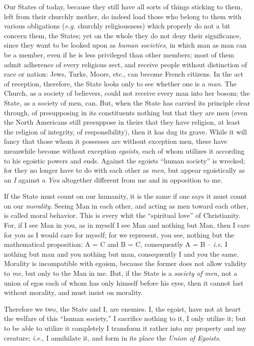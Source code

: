 \documentclass[12pt,a4paper]{book}
\begin{document}
Our States of today, because they still have all sorts of things sticking to 
them, left from their churchly mother, do indeed load those who belong to them 
with various obligations (\textit{e.g.} churchly religiousness) which 
properly do not a bit concern them, the States; yet on the whole they do not 
deny their significance, since they want to be looked upon as \textit{human 
societies}, in which man as man can be a member, even if he is less privileged 
than other members; most of them admit adherence of every religious sect, and 
receive people without distinction of race or nation: Jews, Turks, Moors, 
etc., can become French citizens. In the act of reception, therefore, the 
State looks only to see whether one is a \textit{man}. The Church, as a 
society of believers, could not receive every man into her bosom; the State, 
as a society of men, can. But, when the State has carried its principle clear 
through, of presupposing in its constituents nothing but that they are men 
(even the North Americans still presuppose in theirs that they have religion, 
at least the religion of integrity, of responsibility), then it has dug its 
grave. While it will fancy that those whom it possesses are without exception 
men, these have meanwhile become without exception \textit{egoists}, each of 
whom utilizes it according to his egoistic powers and ends. Against the 
egoists ``human society'' is wrecked; for they no longer have to do with 
each other as \textit{men}, but appear egoistically as an \textit{I} against a 
\textit{You} altogether different from me and in opposition to me.

If the State must count on our humanity, it is the same if one says it must 
count on our \textit{morality}. Seeing Man in each other, and acting as men 
toward each other, is called moral behavior. This is every whit the 
``spiritual love'' of Christianity. For, if I see Man in you, as in myself I 
see Man and nothing but Man, then I care for you as I would care for myself; 
for we represent, you see, nothing but the mathematical proposition: A = C and 
B = C, consequently A = B -- \textit{i.e.} I nothing but man and you nothing 
but man, consequently I and you the same. Morality is incompatible with 
egoism, because the former does not allow validity to \textit{me}, but only to 
the Man in me. But, if the State is a \textit{society of men}, not a union of 
egos each of whom has only himself before his eyes, then it cannot last 
without morality, and must insist on morality.

Therefore we two, the State and I, are enemies. I, the egoist, have not at 
heart the welfare of this ``human society,'' I sacrifice nothing to it, I 
only utilize it; but to be able to utilize it completely I transform it rather 
into my property and my creature; \textit{i.e.}, I annihilate it, and form in 
its place the \textit{Union of Egoists}.
\end{document}
